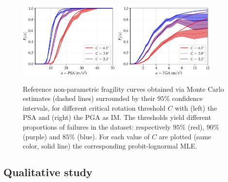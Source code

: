     \begin{figure}[h]
        \centering
        \includegraphics[width=5cm]{figures/DoE/refs_PSA.pdf}\ 
        \includegraphics[width=5cm]{figures/DoE/refs_PGA.pdf}
        \caption{{Reference non-parametric fragility curves obtained via Monte Carlo estimates (dashed lines) surrounded by their $95\%$ confidence intervals, for different critical rotation threshold $C$ with (left) the PSA and (right) the PGA as IM.} The thresholds yield different proportions of failures in the dataset: respectively $95\%$ (red), $90\%$ (purple) and $85\%$ (blue).
        For each value of $C$ are plotted (same color, solid line) the corresponding probit-lognormal MLE.}
        \label{fig:doe:reference-frags}
        \end{figure}


    \subsection{Qualitative study}



